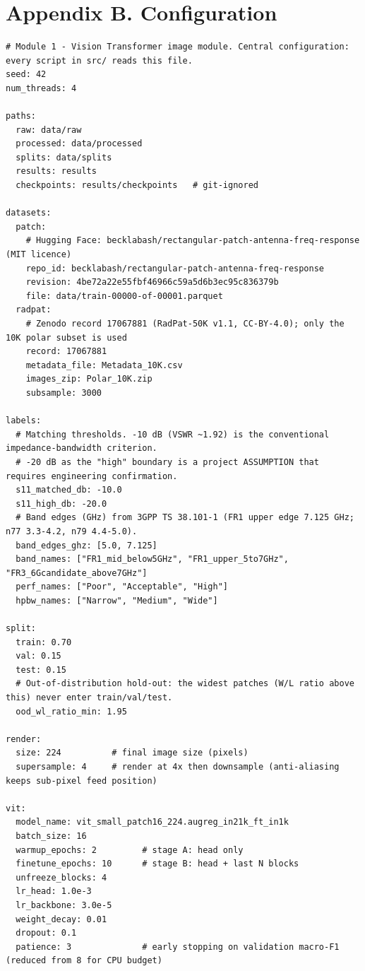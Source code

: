 \documentclass[11pt,a4paper]{article}
\begin{document}
\section*{Appendix B. Configuration}
\begin{verbatim}
# Module 1 - Vision Transformer image module. Central configuration: every script in src/ reads this file.
seed: 42
num_threads: 4

paths:
  raw: data/raw
  processed: data/processed
  splits: data/splits
  results: results
  checkpoints: results/checkpoints   # git-ignored

datasets:
  patch:
    # Hugging Face: becklabash/rectangular-patch-antenna-freq-response (MIT licence)
    repo_id: becklabash/rectangular-patch-antenna-freq-response
    revision: 4be72a22e55fbf46966c59a5d6b3ec95c836379b
    file: data/train-00000-of-00001.parquet
  radpat:
    # Zenodo record 17067881 (RadPat-50K v1.1, CC-BY-4.0); only the 10K polar subset is used
    record: 17067881
    metadata_file: Metadata_10K.csv
    images_zip: Polar_10K.zip
    subsample: 3000

labels:
  # Matching thresholds. -10 dB (VSWR ~1.92) is the conventional impedance-bandwidth criterion.
  # -20 dB as the "high" boundary is a project ASSUMPTION that requires engineering confirmation.
  s11_matched_db: -10.0
  s11_high_db: -20.0
  # Band edges (GHz) from 3GPP TS 38.101-1 (FR1 upper edge 7.125 GHz; n77 3.3-4.2, n79 4.4-5.0).
  band_edges_ghz: [5.0, 7.125]
  band_names: ["FR1_mid_below5GHz", "FR1_upper_5to7GHz", "FR3_6Gcandidate_above7GHz"]
  perf_names: ["Poor", "Acceptable", "High"]
  hpbw_names: ["Narrow", "Medium", "Wide"]

split:
  train: 0.70
  val: 0.15
  test: 0.15
  # Out-of-distribution hold-out: the widest patches (W/L ratio above this) never enter train/val/test.
  ood_wl_ratio_min: 1.95

render:
  size: 224          # final image size (pixels)
  supersample: 4     # render at 4x then downsample (anti-aliasing keeps sub-pixel feed position)

vit:
  model_name: vit_small_patch16_224.augreg_in21k_ft_in1k
  batch_size: 16
  warmup_epochs: 2         # stage A: head only
  finetune_epochs: 10      # stage B: head + last N blocks
  unfreeze_blocks: 4
  lr_head: 1.0e-3
  lr_backbone: 3.0e-5
  weight_decay: 0.01
  dropout: 0.1
  patience: 3              # early stopping on validation macro-F1 (reduced from 8 for CPU budget)


\end{verbatim}
\end{document}
